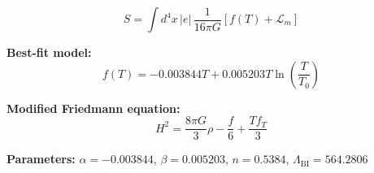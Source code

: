 
\begin{equation}
  S = \int d^4x \, |e| \, \frac{1}{16\pi G} \left[ f(T) + \mathcal{L}_m \right]
\end{equation}

\textbf{Best-fit model:}
\begin{equation}
  f(T) = -0.003844 T + 0.005203 T \ln\!\left(\frac{T}{T_0}\right)
\end{equation}

\textbf{Modified Friedmann equation:}
\begin{equation}
  H^2 = \frac{8\pi G}{3} \rho - \frac{f}{6} + \frac{T f_T}{3}
\end{equation}

\textbf{Parameters:}
$\alpha = -0.003844$, \quad
$\beta = 0.005203$, \quad
$n = 0.5384$, \quad
$\Lambda_{\text{BI}} = 564.2806$